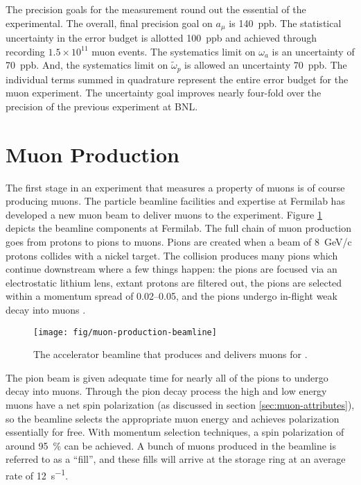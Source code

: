 The precision goals for the measurement round out the essential of the experimental.  The overall, final precision goal on $a_\mu$ is \SI{140}{ppb}.  The statistical uncertainty in the error budget is allotted \SI{100}{ppb} and achieved through recording $1.5\times10^{11}$ muon events.  The systematics limit on $\omega_a$ is an uncertainty of \SI{70}{ppb}.  And, the systematics limit on $\tilde{\omega}_p$ is allowed an uncertainty \SI{70}{ppb}.  The individual terms summed in quadrature represent the entire error budget for the muon \gmtwo experiment.  The uncertainty goal improves nearly four-fold over the precision of the previous experiment at BNL.

\section{Muon Production} \label{sec:muon-production}

The first stage in an experiment that measures a property of muons is of course producing muons.  The particle beamline facilities and expertise at Fermilab has developed a new muon beam to deliver muons to the \gmtwo experiment.  Figure \ref{fig:muon-production-beamline} depicts the beamline components at Fermilab.  The full chain of muon production goes from protons to pions to muons.  Pions are created when a beam of \SI{8}{\GeV/c} protons collides with a nickel target.  The collision produces many pions which continue downstream where a few things happen: the pions are focused via an electrostatic lithium lens, extant protons are filtered out, the pions are selected within a momentum spread of \SIrange{0.02}{0.05}{}, and the pions undergo in-flight weak decay into muons \cite{e989-tdr}.

\begin{figure}
\label{fig:muon-production-beamline}
\texttt{[image: fig/muon-production-beamline]}
\caption{The accelerator beamline that produces and delivers muons for \gmtwo. }
\end{figure}

The pion beam is given adequate time for nearly all of the pions to undergo decay into muons.  Through the pion decay process the high and low energy muons have a net spin polarization (as discussed in section \ref{sec:muon-attributes}), so the beamline selects the appropriate muon energy and achieves polarization essentially for free. With momentum selection techniques, a spin polarization of around \SI{95}{\percent} can be achieved.  A bunch of muons produced in the beamline is referred to as a ``fill'', and these fills will arrive at the storage ring at an average rate of \SI{12}{\second^{-1}}\cite{e989-tdr}.

